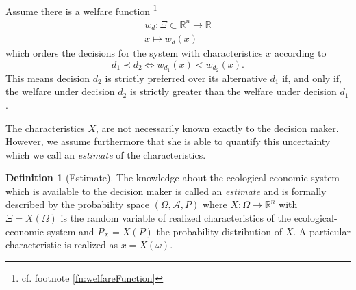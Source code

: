 \documentclass[a4paper,10pt,twoside,pagesize,abstracton]{scrartcl}
\newcommand{\R}{\mathbb{R}}
\theoremstyle{plain}%
\theoremstyle{definition}
\newtheorem{defn}[thm]{Definition}
\theoremstyle{remark}
\begin{document}
Assume there is a welfare function%
\footnote{%
  cf. footnote \ref{fn:welfareFunction}
} 
\begin{align}
 w_d: \Xi \subset \R^n \longrightarrow \R\\
      x \mapsto w_d(x) \nonumber
\end{align}
which orders the decisions for the system with characteristics $x$ according to
\begin{equation}
 d_1 \prec d_2 \Leftrightarrow w_{d_1}(x) < w_{d_2}(x).
\end{equation}
This means decision $d_2$ is strictly preferred over its alternative $d_1$ if, and only if, the welfare under decision $d_2$ is strictly greater than the welfare under decision $d_1$.\par

The characteristics $X$, are not necessarily known exactly to the decision maker. However, we assume furthermore that she is able to quantify this uncertainty which we call an \emph{estimate} of the characteristics. 
\begin{defn}[Estimate]
 The knowledge about the ecological-economic system which is available to the decision maker is called an \emph{estimate} and is formally described by the probability space $(\Omega, \mathcal{A}, P)$ where $X: \Omega \longrightarrow \R^n$ with $\Xi=X(\Omega)$ is the random variable of realized characteristics of the ecological-economic system and $P_X = X(P)$ the probability distribution of $X$. A particular characteristic is realized as $x=X(\omega)$. 
\end{defn}
\end{document}
